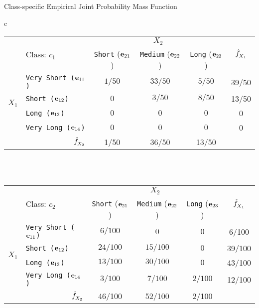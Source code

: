 \begin{frame}{Class-specif\/{i}c Empirical Joint Probability Mass Function}
\label{tab:class:prob:jepmf}%
\footnotesize{
{\begin{tabular}{c}
  \renewcommand{\arraystretch}{1.1}\begin{tabular}{|c|l||c|c|c||c|}
    \hline
    & \multirow{2}{*}{Class: $c_1$}&\multicolumn{3}{c||}{$X_2$} &
    \multirow{2}{*}{$\kern3pt\hat{\kern-3pt f}_{\!X_1}$}\\
    \cline{3-5}
        & & {\tt Short} ($\mathbf{e}_{21}$) & {\tt Medium} ($\mathbf{e}_{22}$) &
        {\tt Long} ($\mathbf{e}_{23}$) & \\
        \hline\hline
        \multirow{4}{*}{$X_1$}
        & {\tt Very Short ($\mathbf{e}_{11}$)} &  ${1/50}$  &
        ${33/50}$  & ${5/50}$ & 39/50\\
        &{\tt Short ($\mathbf{e}_{12}$)} & $0$
        &${3/50}$  & ${8/50}$ & 13/50\\
        &{\tt Long ($\mathbf{e}_{13}$)} & $0$  &
        $0$   & $0$ & 0\\
        &{\tt Very Long ($\mathbf{e}_{14}$)} & $0$  &
        $0$ & $0$ & 0\\
    \hline
    \multicolumn{2}{|r||}{$\kern3pt\hat{\kern-3pt f}_{\!X_2}$} & 1/50 & 36/50 & 13/50 & \\
    \hline
  \end{tabular}\\[12pt]\\
 \renewcommand{\arraystretch}{1.1}\begin{tabular}{|c|l||c|c|c||c|}
    \hline
    & \multirow{2}{*}{Class: $c_2$}&\multicolumn{3}{c||}{$X_2$} &
    \multirow{2}{*}{$\kern3pt\hat{\kern-3pt f}_{\!X_1}$}\\
    \cline{3-5}
        & & {\tt Short} ($\mathbf{e}_{21}$) & {\tt Medium} ($\mathbf{e}_{22}$) &
        {\tt Long} ($\mathbf{e}_{23}$) & \\
        \hline\hline
        \multirow{4}{*}{$X_1$}
        & {\tt Very Short ($\mathbf{e}_{11}$)} &  ${6/100}$  &
        ${0}$  & $0$ & 6/100\\
        &{\tt Short ($\mathbf{e}_{12}$)} & ${24/100}$
        &${15/100}$  &      ${0}$ & 39/100\\
        &{\tt Long ($\mathbf{e}_{13}$)} & ${13/100}$  &
        ${30/100}$   &      ${0}$ & 43/100\\
        &{\tt Very Long ($\mathbf{e}_{14}$)} & ${3/100}$  &
        ${7/100}$       & ${2/100}$ & 12/100\\
    \hline
    \multicolumn{2}{|r||}{$\kern3pt\hat{\kern-3pt f}_{\!X_2}$} & 46/100 & 52/100 & 2/100 &\\
    \hline
  \end{tabular}\\
\end{tabular}}{}
}
\end{frame}




